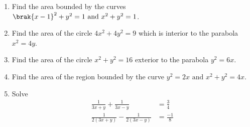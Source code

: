 \begin{enumerate}[label=\thesubsection.\arabic*,ref=\thesubsection.\theenumi]
%
\item Find the area bounded by the curves $\brak{x-1}^2 + y^2 = 1 \text{ and } x^2+y^2=1$.
\label{chapters/12/8/2/2}
\\
\solution

\item 
	Find the area of the circle $4x^2+4y^2=9$ which is interior to the parabola $x^2=4y$.
\label{chapters/12/8/2/1}
\item 
	Find the area of the circle $x^2 + y^2 = 16$ exterior to the parabola $y^2 = 6x$.
\label{chapters/12/8/3/18}
\item Find the area of the region bounded by the curve $y^2 = 2x\text{ and }x^2 + y^2 = 4x$.
\item
Solve
\begin{align*}
\frac{1}{3x+y}+\frac{1}{3x-y}&=\frac{3}{4}\\ \frac{1}{2(3x+y)}-\frac{1}{2(3x-y)}&=\frac{-1}{8}
\end{align*}
\end{enumerate}
